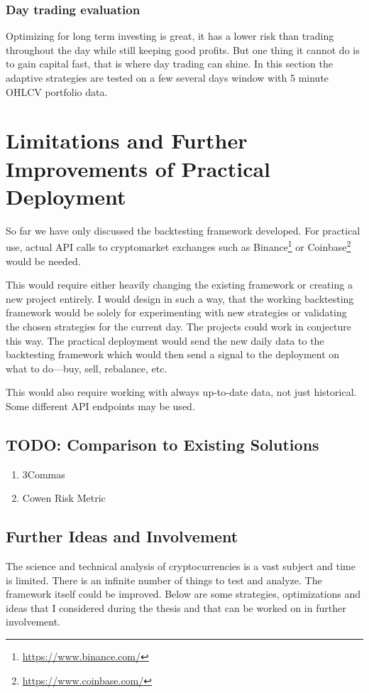 \subsection*{Day trading evaluation}
Optimizing for long term investing is great, it has a lower risk than trading throughout the day while still keeping good profits. But one thing it cannot do is to gain capital fast, that is where day trading can shine. In this section the adaptive strategies are tested on a few several days window with 5 minute OHLCV portfolio data.

\chapter{Limitations and Further Improvements of Practical Deployment}
\label{chapter-limitations-and-improvements}

So far we have only discussed the backtesting framework developed. For practical use, actual API calls to cryptomarket exchanges such as Binance\footnote{\url{https://www.binance.com/}} or Coinbase\footnote{\url{https://www.coinbase.com/}} would be needed.

This would require either heavily changing the existing framework or creating a new project entirely. I would design in such a way, that the working backtesting framework would be solely for experimenting with new strategies or validating the chosen strategies for the current day. The projects could work in conjecture this way. The practical deployment would send the new daily data to the backtesting framework which would then send a signal to the deployment on what to do---buy, sell, rebalance, etc.

This would also require working with always up-to-date data, not just historical. Some different API endpoints may be used.

\section{TODO: Comparison to Existing Solutions}
\begin{enumerate}
    \item 3Commas
    \item Cowen Risk Metric
\end{enumerate}

\section{Further Ideas and Involvement}
The science and technical analysis of cryptocurrencies is a vast subject and time is limited. There is an infinite number of things to test and analyze. The framework itself could be improved. Below are some strategies, optimizations and ideas that I considered during the thesis and that can be worked on in further involvement.

